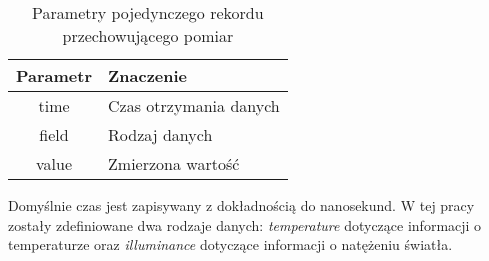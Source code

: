     \begin{xltabular}{1\textwidth} { 
        | >{\raggedright\arraybackslash}c 
        | >{\raggedright\arraybackslash}X | }
        \caption{Parametry pojedynczego rekordu przechowującego pomiar} \label{tab:parametry-pomiaru}\\
        \hline
       Parametr & Znaczenie \\
       \hline
       time & Czas otrzymania danych \\
       \hline
       field & Rodzaj danych \\
       \hline
       value & Zmierzona wartość \\
       \hline
    \end{xltabular}

    Domyślnie czas jest zapisywany z dokładnością do nanosekund. W tej pracy zostały
    zdefiniowane dwa rodzaje danych: \textit{temperature} dotyczące informacji o temperaturze 
    oraz \textit{illuminance} dotyczące informacji o natężeniu światła.